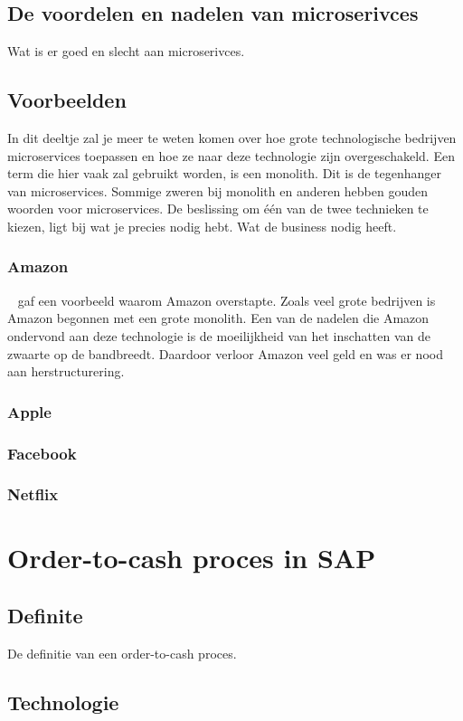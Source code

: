 \subsection{De voordelen en nadelen van microserivces}
Wat is er goed en slecht aan microserivces.
\subsection{Voorbeelden}
In dit deeltje zal je meer te weten komen over hoe grote technologische bedrijven microservices toepassen en hoe ze naar deze technologie zijn overgeschakeld.
Een term die hier vaak zal gebruikt worden, is een monolith. Dit is de tegenhanger van microservices. Sommige zweren bij monolith en anderen hebben gouden woorden voor microservices. De beslissing om één van de twee technieken te kiezen, ligt bij wat je precies nodig hebt. Wat de business nodig heeft. 
\subsubsection{Amazon}
~\cite{Mauersberger2017} gaf een voorbeeld waarom Amazon overstapte. Zoals veel grote bedrijven is Amazon begonnen met een grote monolith. Een van de nadelen die Amazon ondervond aan deze technologie is de moeilijkheid van het inschatten van de zwaarte op de bandbreedt. Daardoor verloor Amazon veel geld en was er nood aan herstructurering.
\subsubsection{Apple}
\subsubsection{Facebook}
\subsubsection{Netflix}

\section{Order-to-cash proces in SAP}
\subsection{Definite}
De definitie van een order-to-cash proces.
\subsection{Technologie}
